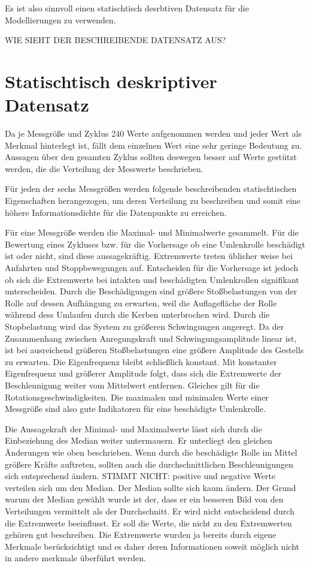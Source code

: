 Es ist also sinnvoll einen statischtisch desrbtiven Datensatz für die Modellierungen zu verwenden.

WIE SIEHT DER BESCHREIBENDE DATENSATZ AUS?
\section{Statischtisch deskriptiver Datensatz}
\label{sec:deskriptiver datensatz}
Da je Messgröße und Zyklus 240 Werte aufgenommen werden und jeder Wert als Merkmal hinterlegt ist, fällt dem einzelnen Wert eine sehr geringe Bedeutung zu. Aussagen über den gesamten Zyklus sollten deswegen besser auf Werte gestützt werden, die die Verteilung der Messwerte beschrieben. 

Für jeden der sechs Messgrößen werden folgende beschreibenden statischtischen Eigenschaften herangezogen, um deren Verteilung zu beschreiben und somit eine höhere Informationsdichte für die Datenpunkte zu erreichen.

Für eine Messgröße werden die Maximal- und Minimalwerte gesammelt. Für die Bewertung eines Zykluses bzw. für die Vorhersage ob eine Umlenkrolle beschädigt ist oder nicht, sind diese aussagekräftig. Extremwerte treten üblicher weise bei Anfahrten und Stoppbewegungen auf. Entscheiden für die Vorhersage ist jedoch ob sich die Extremwerte bei intakten und beschädigten Umlenkrollen signifikant unterscheiden. 
Durch die Beschädigungen sind größere Stoßbelastungen von der Rolle auf dessen Aufhängung zu erwarten, weil die Auflagefläche der Rolle während dess Umlaufen durch die Kerben unterbrochen wird. Durch die Stopbelastung wird das System zu größeren Schwingungen angeregt. Da der Zusammenhang zwischen Anregungskraft und Schwingungsamplitude linear ist, ist bei ausreichend größeren Stoßbelastungen eine größere Amplitude des Gestells zu erwarten. Die Eigenfrequenz bleibt schließlich konstant. Mit konstanter Eigenfrequenz und größerer Amplitude folgt, dass sich die Extremwerte der Beschleunigung weiter vom Mittelwert entfernen. Gleiches gilt für die Rotationsgeschwindigkeiten. Die maximalen und minimalen Werte einer Messgröße sind also gute Indikatoren für eine beschädigte Umlenkrolle.

Die Aussagekraft der Minimal- und Maximalwerte lässt sich durch die Einbeziehung des Median weiter untermauern. Er unterliegt den gleichen Änderungen wie oben beschrieben. Wenn durch die beschädigte Rolle im Mittel größere Kräfte auftreten, sollten auch die durchschnittlichen Beschleunigungen sich entsprechend ändern. STIMMT NICHT: positive und negative Werte verteilen sich um den Median. Der Median sollte sich kaum ändern.
Der Grund warum der Median gewählt wurde ist der, dass er ein besseren Bild von den Verteilungen vermittelt als der Durchschnitt. Er wird nicht entscheidend durch die Extremwerte beeinflusst. Er soll die Werte, die nicht zu den Extremwerten gehören gut beschreiben. Die Extremwerte wurden ja bereits durch eigene Merkmale berücksichtigt und es daher deren Informationen soweit möglich nicht in andere merkmale überführt werden.

